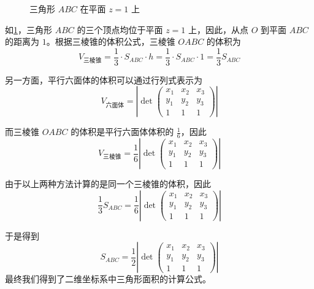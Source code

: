\documentclass[11pt]{article}%
\begin{document}
\begin{figure}[H]
        \caption{三角形 $ABC$ 在平面 $z=1$ 上}
        \label{fig:tetrahedron-3d}
    \end{figure}

    如\cref{fig:tetrahedron-3d}，三角形 $ABC$ 的三个顶点均位于平面 $z=1$ 上，因此，从点 $O$ 到平面 $ABC$ 的距离为 $1$。根据三棱锥的体积公式，三棱锥 $OABC$ 的体积为
    \[
    V_{\text{三棱锥}} = \frac{1}{3} \cdot S_{ABC} \cdot h = \frac{1}{3} \cdot S_{ABC} \cdot 1 = \frac{1}{3} S_{ABC}
    \]

    另一方面，平行六面体的体积可以通过行列式表示为
    \[
    V_{\text{六面体}}
    =
    \left|
    \det
    \begin{pmatrix}
    x_1 & x_2 & x_3\\
    y_1 & y_2 & y_3\\
    1 & 1 & 1
    \end{pmatrix}
    \right|
    \]

    而三棱锥 $OABC$ 的体积是平行六面体体积的 $\frac{1}{6}$，因此
    \[
    V_{\text{三棱锥}}
    =
    \frac{1}{6}
    \left|
    \det
    \begin{pmatrix}
    x_1 & x_2 & x_3\\
    y_1 & y_2 & y_3\\
    1 & 1 & 1
    \end{pmatrix}
    \right|
    \]

    由于以上两种方法计算的是同一个三棱锥的体积，因此
    \[
    \frac{1}{3}S_{ABC}
    =
    \frac{1}{6}
    \left|
    \det
    \begin{pmatrix}
    x_1 & x_2 & x_3\\
    y_1 & y_2 & y_3\\
    1 & 1 & 1
    \end{pmatrix}
    \right|
    \]

    于是得到
    \[
    \boxed{
    S_{ABC}
    =
    \frac{1}{2}
    \left|
    \det
    \begin{pmatrix}
    x_1 & x_2 & x_3\\
    y_1 & y_2 & y_3\\
    1 & 1 & 1
    \end{pmatrix}
    \right|
    }
    \]
    最终我们得到了二维坐标系中三角形面积的计算公式。
\end{document}
